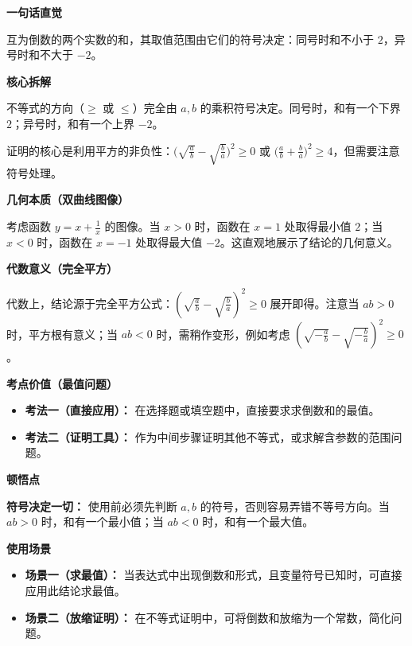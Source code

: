 \begin{explanationbox}
\textbf{\textcolor{CExplanation}{一句话直觉}}

互为倒数的两个实数的和，其取值范围由它们的符号决定：同号时和不小于 $2$，异号时和不大于 $-2$。

\medskip
\textbf{\textcolor{CExplanation}{核心拆解}}
\begin{description}[style=nextline, leftmargin=2.8em, labelsep=0.5em, itemsep=0.45em]
    \item[\textbf{要点一（符号定方向）：}] 不等式的方向（$\geq$ 或 $\leq$）完全由 $a,b$ 的乘积符号决定。同号时，和有一个下界 $2$；异号时，和有一个上界 $-2$。
    \item[\textbf{要点二（平方非负）：}] 证明的核心是利用平方的非负性：$\bigl(\sqrt{\frac{a}{b}} - \sqrt{\frac{b}{a}}\bigr)^2 \geq 0$ 或 $\bigl(\frac{a}{b} + \frac{b}{a}\bigr)^2 \geq 4$，但需要注意符号处理。
\end{description}

\medskip
\textbf{\textcolor{CExplanation}{几何本质（双曲线图像）}}

考虑函数 $y = x + \frac{1}{x}$ 的图像。当 $x>0$ 时，函数在 $x=1$ 处取得最小值 $2$；当 $x<0$ 时，函数在 $x=-1$ 处取得最大值 $-2$。这直观地展示了结论的几何意义。

\medskip
\textbf{\textcolor{CExplanation}{代数意义（完全平方）}}

代数上，结论源于完全平方公式：$\left(\sqrt{\frac{a}{b}} - \sqrt{\frac{b}{a}}\right)^2 \geq 0$ 展开即得。注意当 $ab>0$ 时，平方根有意义；当 $ab<0$ 时，需稍作变形，例如考虑 $\left(\sqrt{-\frac{a}{b}} - \sqrt{-\frac{b}{a}}\right)^2 \geq 0$。

\medskip
\textbf{\textcolor{CExplanation}{考点价值（最值问题）}}
\begin{itemize}[leftmargin=*, itemsep=0.5em, topsep=0.4em]
    \item \textbf{考法一（直接应用）：} 在选择题或填空题中，直接要求求倒数和的最值。
    \item \textbf{考法二（证明工具）：} 作为中间步骤证明其他不等式，或求解含参数的范围问题。
\end{itemize}

\medskip
\textbf{\textcolor{CExplanation}{顿悟点}}

\textbf{符号决定一切：} 使用前必须先判断 $a,b$ 的符号，否则容易弄错不等号方向。当 $ab>0$ 时，和有一个最小值；当 $ab<0$ 时，和有一个最大值。

\medskip
\textbf{\textcolor{CExplanation}{使用场景}}
\begin{itemize}[leftmargin=*, itemsep=0.5em, topsep=0.4em]
    \item \textbf{场景一（求最值）：} 当表达式中出现倒数和形式，且变量符号已知时，可直接应用此结论求最值。
    \item \textbf{场景二（放缩证明）：} 在不等式证明中，可将倒数和放缩为一个常数，简化问题。
\end{itemize}
\end{explanationbox}

